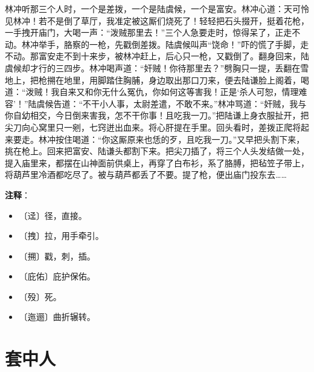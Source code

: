 \documentclass[12pt,UTF-8,openany]{ctexbook}
\begin{document}
\begin{large}
    林冲听那三个人时，一个是差拨，一个是陆虞候，一个是富安。林冲心道：天可怜见林冲！若不是倒了草厅，我准定被这厮们烧死了！轻轻把石头掇开，挺着花枪，一手拽开庙门，大喝一声：“泼贼那里去！”三个人急要走时，惊得呆了，正走不动。林冲举手，胳察的一枪，先戳倒差拨。陆虞候叫声“饶命！”吓的慌了手脚，走不动。那富安走不到十来步，被林冲赶上，后心只一枪，又戳倒了。翻身回来，陆虞候却才行的三四步。林冲喝声道：“奸贼！你待那里去？”劈胸只一提，丢翻在雪地上，把枪搠在地里，用脚踏住胸脯，身边取出那口刀来，便去陆谦脸上阁着，喝道：“泼贼！我自来又和你无什么冤仇，你如何这等害我！正是‘杀人可恕，情理难容’！”陆虞候告道：“不干小人事，太尉差遣，不敢不来。”林冲骂道：“奸贼，我与你自幼相交，今日倒来害我，怎不干你事！且吃我一刀。”把陆谦上身衣服扯开，把尖刀向心窝里只一剜，七窍迸出血来。将心肝提在手里。回头看时，差拨正爬将起来要走。林冲按住喝道：“你这厮原来也恁的歹，且吃我一刀。”又早把头割下来，挑在枪上。回来把富安、陆谦头都割下来。把尖刀插了，将三个人头发结做一处，提入庙里来，都摆在山神面前供桌上，再穿了白布衫，系了胳膊，把毡笠子带上，将葫芦里冷酒都吃尽了。被与葫芦都丢了不要。提了枪，便出庙门投东去……
    
\end{large}


\newpage

\textbf{注释}：

\vspace{-1em}

\begin{itemize}
    \setlength\itemsep{-0.2em}
    \item 〔迳〕径，直接。
    \item 〔拽〕拉，用手牵引。
    \item 〔搠〕戳，刺，插。
    \item 〔庇佑〕庇护保佑。
    \item 〔殁〕死。
    \item 〔迤逦〕曲折辗转。
\end{itemize}

\chapter{套中人}
\end{document}
